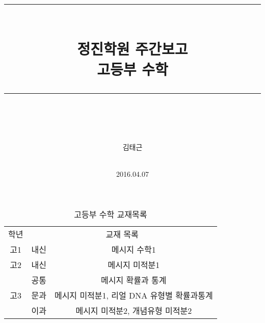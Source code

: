 \documentclass[idxtotoc,hyperref,openany]{labbook} %
\newcommand{\HRule}{\rule{\linewidth}{0.5mm}} %
\begin{document}

\frontmatter %
\title{
\begin{center}
\HRule \\[0.4cm]
{\Huge \bfseries 정진학원 주간보고  \\[0.5cm] \Large 고등부 수학}\\[0.4cm] %
\HRule \\[1.5cm]
\end{center}
}
\author{\LARGE 김태근 \\  \\[2cm]} %
\date{2016.04.07} %
\maketitle

\tableofcontents

\mainmatter %












\begin{table}[h]
\centering
\begin{adjustbox}{width=\textwidth}
\begin{tabular}{c||c|c}
\toprule
\midrule
학년 & \multicolumn{2}{c}{교재 목록} \\
\hhline{=||==}
고1 & 내신 & 메시지 수학1 \\
\hline
고2 & 내신 & 메시지 미적분1\\
\hline
\multirow{3}{*}{고3} & 공통 & 메시지 확률과 통계 \\ \hhline{~--}
					& 문과 & 메시지 미적분1, 리얼 DNA 유형별 확률과통계\\ \hhline{~--}
					& 이과 & 메시지 미적분2, 개념유형 미적분2\\

\hline
\end{tabular}
\end{adjustbox}
\caption{\label{tab:i} 고등부 수학 교재목록 }
\end{table}
\end{document}
